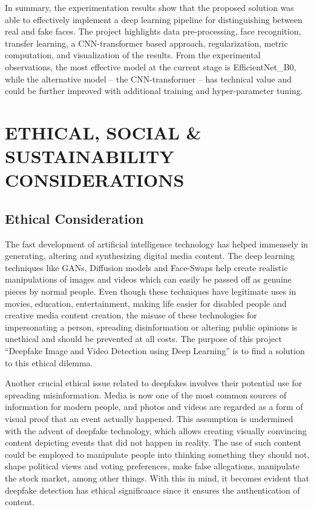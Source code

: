 \documentclass[12pt,a4paper]{report}
\begin{document}
In summary, the experimentation results show that the proposed solution was able to effectively implement a deep learning pipeline for distinguishing between real and fake faces. The project highlights data pre-processing, face recognition, transfer learning, a CNN-transformer based approach, regularization, metric computation, and visualization of the results. From the experimental observations, the most effective model at the current stage is EfficientNet\_B0, while the alternative model – the CNN-transformer – has technical value and could be further improved with additional training and hyper-parameter tuning.


\chapter{ETHICAL, SOCIAL \& SUSTAINABILITY CONSIDERATIONS}
\section{Ethical Consideration}
The fast development of artificial intelligence technology has helped immensely in generating, altering and synthesizing digital media content. The deep learning techniques like GANs, Diffusion models and Face-Swaps help create realistic manipulations of images and videos which can easily be passed off as genuine pieces by normal people. Even though these techniques have legitimate uses in movies, education, entertainment, making life easier for disabled people and creative media content creation, the misuse of these technologies for impersonating a person, spreading disinformation or altering public opinions is unethical and should be prevented at all costs. The purpose of this project ``Deepfake Image and Video Detection using Deep Learning'' is to find a solution to this ethical dilemma.

Another crucial ethical issue related to deepfakes involves their potential use for spreading misinformation. Media is now one of the most common sources of information for modern people, and photos and videos are regarded as a form of visual proof that an event actually happened. This assumption is undermined with the advent of deepfake technology, which allows creating visually convincing content depicting events that did not happen in reality. The use of such content could be employed to manipulate people into thinking something they should not, shape political views and voting preferences, make false allegations, manipulate the stock market, among other things. With this in mind, it becomes evident that deepfake detection has ethical significance since it ensures the authentication of content.
\end{document}

